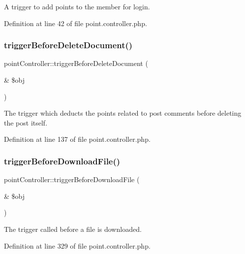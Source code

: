A trigger to add points to the member for login. 



Definition at line 42 of file point.\+controller.\+php.

\hypertarget{classpointController_a6773e89c36c2ad9086f1e4628149123c}{}\label{classpointController_a6773e89c36c2ad9086f1e4628149123c} 
\subsubsection{\texorpdfstring{trigger\+Before\+Delete\+Document()}{triggerBeforeDeleteDocument()}}
{\footnotesize\ttfamily point\+Controller\+::trigger\+Before\+Delete\+Document (\begin{DoxyParamCaption}\item[{\&}]{\$obj }\end{DoxyParamCaption})}



The trigger which deducts the points related to post comments before deleting the post itself. 



Definition at line 137 of file point.\+controller.\+php.

\hypertarget{classpointController_afa504365e28861dc15a905c46e1f29e3}{}\label{classpointController_afa504365e28861dc15a905c46e1f29e3} 
\subsubsection{\texorpdfstring{trigger\+Before\+Download\+File()}{triggerBeforeDownloadFile()}}
{\footnotesize\ttfamily point\+Controller\+::trigger\+Before\+Download\+File (\begin{DoxyParamCaption}\item[{\&}]{\$obj }\end{DoxyParamCaption})}



The trigger called before a file is downloaded. 



Definition at line 329 of file point.\+controller.\+php.

